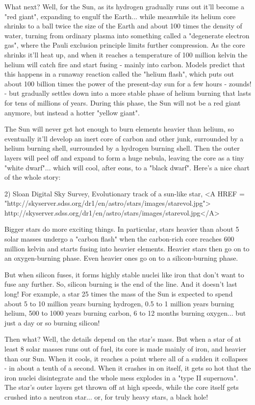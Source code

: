 What next?  Well, for the Sun, as its hydrogen gradually runs out it'll 
become a "red giant", expanding to engulf the Earth... while meanwhile 
its helium core shrinks to a ball twice the size of the Earth and about 
100 times the density of water, turning from ordinary plasma into 
something called a "degenerate electron gas", where the Pauli exclusion 
principle limits further compression.  As the core shrinks it'll heat up, 
and when it reaches a temperature of 100 million kelvin the helium will 
catch fire and start fusing - mainly into carbon.  Models predict that 
this happens in a runaway reaction called the "helium flash", which puts 
out about 100 billion times the power of the present-day sun for a few 
hours - zounds! - but gradually settles down into a more stable phase 
of helium burning that lasts for tens of millions of years.  During 
this phase, the Sun will not be a red giant anymore, but instead a 
hotter "yellow giant".  

The Sun will never get hot enough to burn elements heavier than helium,
so eventually it'll develop an inert core of carbon and other junk, 
surrounded by a helium burning shell, surrounded by a hydrogen burning
shell.  Then the outer layers will peel off and expand to form a huge 
nebula, leaving the core as a tiny "white dwarf"... which will cool, 
after eons, to a "black dwarf".  Here's a nice chart of the whole story:

2) Sloan Digital Sky Survey, Evolutionary track of a sun-like star,
<A HREF = "http://skyserver.sdss.org/dr1/en/astro/stars/images/starevol.jpg">
http://skyserver.sdss.org/dr1/en/astro/stars/images/starevol.jpg</A>

Bigger stars do more exciting things.  In particular, stars heavier than
about 5 solar masses undergo a "carbon flash" when the carbon-rich 
core reaches 600 million kelvin and starts fusing into heavier elements.
Heavier stars then go on to an oxygen-burning phase.  Even heavier ones 
go on to a silicon-burning phase.  

But when silicon fuses, it forms highly stable nuclei like iron that 
don't want to fuse any further.   So, silicon burning is the end of the 
line.  And it doesn't last long!  For example, a star 25 times the mass
of the Sun is expected to spend about 5 to 10 million years burning 
hydrogen, 0.5 to 1 million years burning helium, 500 to 1000 years 
burning carbon, 6 to 12 months burning oxygen... but just a day or so 
burning silicon! 

Then what?  Well, the details depend on the star's mass.  But when a
star of at least 8 solar masses runs out of fuel, its core is made 
mainly of iron, and heavier than our Sun.  When it cools, it reaches a 
point where all of a sudden it collapses - in about a tenth of a second.   
When it crashes in on itself, it gets so hot that the iron nuclei 
disintegrate and the whole mess explodes in a "type II supernova".  
The star's outer layers get thrown off at high speeds, while the core 
itself gets crushed into a neutron star... or, for truly heavy stars, 
a black hole!

